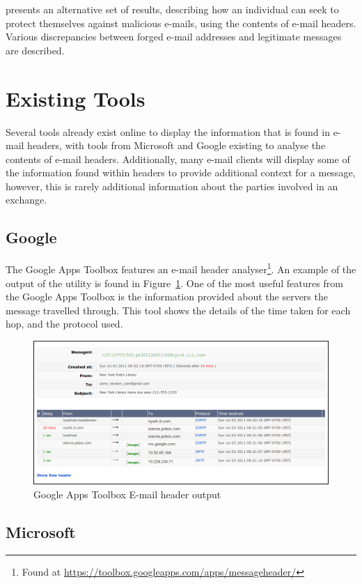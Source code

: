 \cite{Al-zarouni_tracinge-mail} presents an alternative set of results,
describing how an individual can seek to protect themselves against malicious
e-mails, using the contents of e-mail headers.  Various discrepancies between
forged e-mail addresses and legitimate messages are described.

\section{Existing Tools}

Several tools already exist online to display the information that is found in
e-mail headers, with tools from Microsoft and Google existing to analyse the
contents of e-mail headers. Additionally, many e-mail clients will display some
of the information found within headers to provide additional context for a
message, however, this is rarely additional information about the parties
involved in an exchange.

\subsection{Google}\label{sec:goo}

The Google Apps Toolbox features an e-mail header analyser\footnote{Found at
    \url{https://toolbox.googleapps.com/apps/messageheader/}}. An example of
the output of the utility is found in Figure~\ref{fig:goo}.  One of the most
useful features from the Google Apps Toolbox is the information provided about
the servers the message travelled through.  This tool shows the details of the
time taken for each hop, and the protocol used.

\begin{figure}[ht] \centering
\includegraphics[width=0.9\linewidth]{google-header}
\caption{Google Apps Toolbox E-mail header output} \label{fig:goo}\end{figure}

\subsection{Microsoft}\label{sec:mic}

